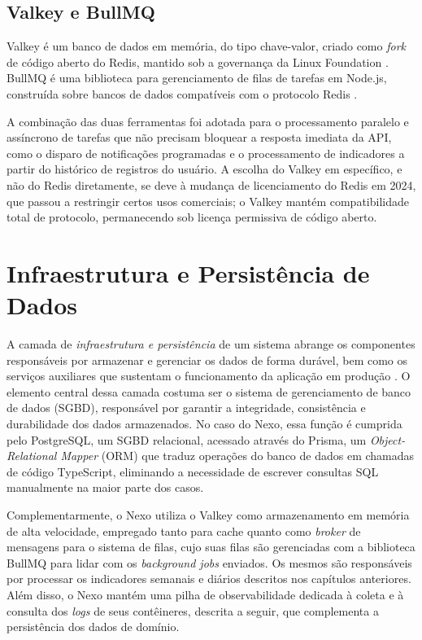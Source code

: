 \subsection{Valkey e BullMQ}

Valkey é um banco de dados em memória, do tipo chave-valor, criado como
\textit{fork} de código aberto do Redis, mantido sob a governança da Linux
Foundation \citep{valkey:2026}. BullMQ é uma biblioteca para gerenciamento de
filas de tarefas em Node.js, construída sobre bancos de dados compatíveis com
o protocolo Redis \citep{bullmq:2026}.

A combinação das duas ferramentas foi adotada para o processamento paralelo
e assíncrono de tarefas que não precisam bloquear a resposta imediata da API,
como o disparo de notificações programadas e o processamento de indicadores
a partir do histórico de registros do usuário. A escolha do Valkey em
específico, e não do Redis diretamente, se deve à mudança de licenciamento do
Redis em 2024, que passou a restringir certos usos comerciais; o Valkey
mantém compatibilidade total de protocolo, permanecendo sob licença
permissiva de código aberto.

\section{Infraestrutura e Persistência de Dados}

A camada de \textit{infraestrutura e persistência} de um sistema abrange os
componentes responsáveis por armazenar e gerenciar os dados de forma durável,
bem como os serviços auxiliares que sustentam o funcionamento da aplicação em
produção \cite{Fowler_2013}. O elemento central dessa camada costuma ser o
sistema de gerenciamento de banco de dados (SGBD), responsável por garantir a
integridade, consistência e durabilidade dos dados armazenados. No caso do
Nexo, essa função é cumprida pelo PostgreSQL, um SGBD relacional, acessado
através do Prisma, um \textit{Object-Relational Mapper} (ORM) que traduz
operações do banco de dados em chamadas de código TypeScript, eliminando a
necessidade de escrever consultas SQL manualmente na maior parte dos casos.

Complementarmente, o Nexo utiliza o Valkey como armazenamento em memória de
alta velocidade, empregado tanto para cache quanto como \textit{broker} de
mensagens para o sistema de filas, cujo suas filas são gerenciadas com a
biblioteca BullMQ para lidar com os \textit{background jobs} enviados. Os
mesmos são responsáveis por processar os indicadores semanais e diários
descritos nos capítulos anteriores. Além disso, o Nexo mantém uma pilha de
observabilidade dedicada à coleta e à consulta dos \textit{logs} de seus
contêineres, descrita a seguir, que complementa a persistência dos dados de
domínio.

